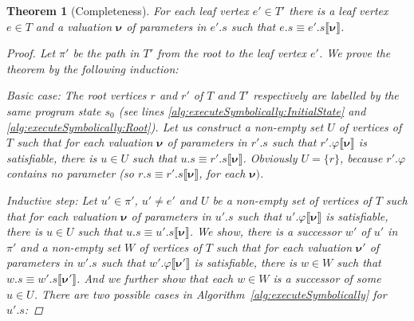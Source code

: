 \documentclass{sig-alternate}%
\newtheorem{thm}{Theorem}%
\newcommand{\prm}[1]{\ensuremath{\llbracket #1 \rrbracket}}
\newcommand{\bld}[1]{\ensuremath{\boldsymbol{#1}}}
\begin{document}
\begin{thm}[Completeness]
For each leaf vertex $e' \in T'$ there is a leaf vertex $e \in T$ and
a valuation $\bld{\nu}$ of parameters in $e'.s$ such that $e.s \equiv
e'.s\prm{\bld{\nu}}$.
\begin{proof}
Let $\pi'$ be the path in $T'$ from the root to the leaf vertex $e'$.
We prove the theorem by the following induction:

\emph{Basic case}: The root vertices $r$ and $r'$ of $T$ and $T'$
respectively are labelled by the same program state $s_0$ (see lines
\ref{alg:executeSymbolically:InitialState} and
\ref{alg:executeSymbolically:Root}). Let us construct a non-empty set
$U$ of vertices of $T$ such that for each valuation $\bld{\nu}$ of
parameters in $r'.s$ such that $r'.\varphi\prm{\bld{\nu}}$ is
satisfiable, there is $u \in U$ such that $u.s \equiv
r'.s\prm{\bld{\nu}}$. Obviously $U = \{ r \}$, because $r'.\varphi$
contains no parameter (so $r.s \equiv r'.s\prm{\bld{\nu}}$, for each
$\bld{\nu})$.

\emph{Inductive step}:  Let $u' \in \pi'$, $u' \neq e'$ and $U$ be a
non-empty set of vertices of $T$ such that for each valuation
$\bld{\nu}$ of parameters in $u'.s$ such that
$u'.\varphi\prm{\bld{\nu}}$ is satisfiable, there is $u \in U$ such
that $u.s \equiv u'.s\prm{\bld{\nu}}$. We show, there is a successor
$w'$ of $u'$ in $\pi'$ and a non-empty set $W$ of vertices of $T$ such
that for each valuation $\bld{\nu}'$ of parameters in $w'.s$ such that
$w'.\varphi\prm{\bld{\nu}'}$ is satisfiable, there is $w \in W$ such
that $w.s \equiv w'.s\prm{\bld{\nu}'}$. And we further show that each
$w \in W$ is a successor of some $u \in U$. There are two possible
cases in Algorithm~\ref{alg:executeSymbolically} for $u'.s$:


\end{proof}
\end{thm}
\end{document}
